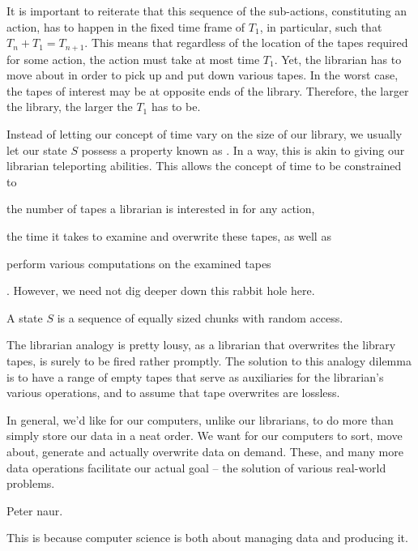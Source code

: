 It is important to reiterate that this sequence of the sub-actions,
constituting an action, has to happen in the fixed time frame of $T_1$, in
particular, such that $T_n+T_1=T_{n+1}$.  This means that regardless of the
location of the tapes required for some action, the action must take at most
time $T_1$. Yet, the librarian has to move about in order to pick up and put
down various tapes. In the worst case, the tapes of interest may be at opposite
ends of the library. Therefore, the larger the library, the larger the $T_1$
has to be. 

Instead of letting our concept of time vary on the size of our library, we
usually let our state $S$ possess a property known as . In a
way, this is akin to giving our librarian teleporting abilities. This allows
the concept of time to be constrained to \begin{inparaenum}[(1)] \item the
number of tapes a librarian is interested in for any action, \item the time it
takes to examine and overwrite these tapes, as well as \item perform various
computations on the examined tapes\end{inparaenum}. However, we need not dig
deeper down this rabbit hole here.

\begin{definition}

A state $S$ is a sequence of equally sized chunks with random access.

\end{definition}

The librarian analogy is pretty lousy, as a librarian that overwrites the
library tapes, is surely to be fired rather promptly. The solution to this
analogy dilemma is to have a range of empty tapes that serve as auxiliaries for
the librarian's various operations, and to assume that tape overwrites are
lossless. 


In general, we'd like for our computers, unlike our librarians, to do more than
simply store our data in a neat order. We want for our computers to sort, move
about, generate and actually overwrite data on demand. These, and many more
data operations facilitate our actual goal -- the solution of various
real-world problems.

Peter naur.

This is because computer science is both about
managing data and producing it. 

